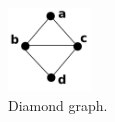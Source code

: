  \begin{figure}[htb]	
 \center%
 \includegraphics[width=2.2cm]{./img/diamond.png}
 \caption{Diamond graph.}
\label{fig:diamond}
\end{figure}  
 
